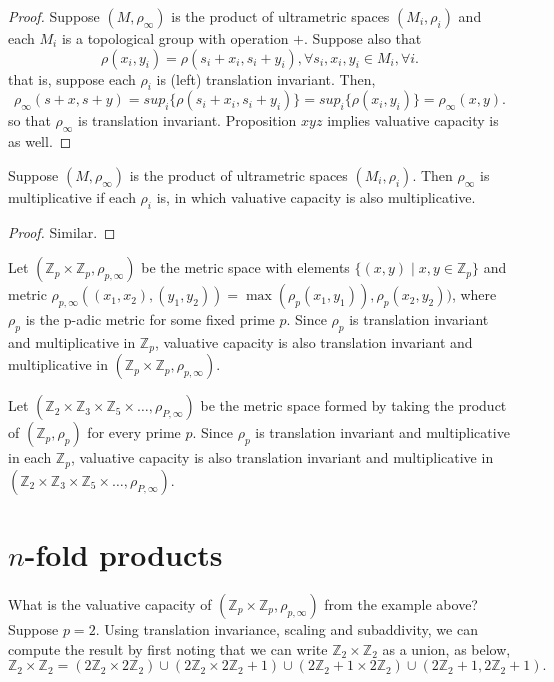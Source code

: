 \begin{proof}
Suppose $(M,\rho_\infty)$ is the product of ultrametric spaces $(M_i, \rho_i)$ and each $M_i$ is a topological group with operation $+$. Suppose also that \[\rho(x_i,y_i) = \rho(s_i + x_i, s_i +y_i), \forall s_i, x_i, y_i \in M_i, \forall i.\] that is, suppose each $\rho_i$ is (left) translation invariant. Then,  
\[
\rho_\infty(s +x, s+y)  
= sup_i\{\rho(s_i +x_i, s_i + y_i)\} 
= sup_i\{\rho(x_i, y_i)\}
= \rho_\infty(x,y).
\] so that $\rho_\infty$ is translation invariant.  Proposition $xyz$ implies valuative capacity is as well. 
\end{proof}


\begin{proposition*}
Suppose $(M,\rho_\infty)$ is the product of ultrametric spaces $(M_i, \rho_i)$. Then $\rho_\infty$ is multiplicative if each $\rho_i$ is, in which valuative capacity is also multiplicative.
\end{proposition*}

\begin{proof}
Similar.
\end{proof}

\begin{example}
	Let $(\mathbb{Z}_p \times \mathbb{Z}_p, \rho_{p,\infty})$ be the metric space with elements $\{(x,y)\mid x,y \in \mathbb{Z}_p\}$ and metric $\rho_{p,\infty}((x_1,x_2), (y_1,y_2)) = \max(\rho_p(x_1, y_1)), \rho_p(x_2, y_2))$, where $\rho_p$ is the p-adic metric for some fixed prime $p$. Since $\rho_p$ is translation invariant and multiplicative in $\mathbb{Z}_p$, valuative capacity is also translation invariant and multiplicative in  $(\mathbb{Z}_p \times \mathbb{Z}_p, \rho_{p,\infty})$.
\end{example}


\begin{example}
	Let $(\mathbb{Z}_2 \times \mathbb{Z}_3 \times \mathbb{Z}_5 \times \ldots, \rho_{P,\infty})$ be the metric space formed by taking the product of $(\mathbb{Z}_p, \rho_p)$ for every prime $p$. Since $\rho_p$ is translation invariant and multiplicative in each $\mathbb{Z}_p$, valuative capacity is also translation invariant and multiplicative in  $(\mathbb{Z}_2 \times \mathbb{Z}_3 \times \mathbb{Z}_5 \times \ldots, \rho_{P,\infty})$.
\end{example}

\section*{ \textbf{$n$-fold products}}
What is the valuative capacity of  $(\mathbb{Z}_p \times \mathbb{Z}_p, \rho_{p,\infty})$  from the example above? Suppose $p=2$.  Using translation invariance, scaling and subaddivity, we can compute the result by first noting that we can write $\mathbb{Z}_2 \times \mathbb{Z}_2$ as a union, as below,
\[
\mathbb{Z}_2 \times \mathbb{Z}_2 = (2\mathbb{Z}_2 \times 2\mathbb{Z}_2) \cup (2\mathbb{Z}_2 \times 2\mathbb{Z}_2 +1) \cup (2\mathbb{Z}_2+1 \times 2\mathbb{Z}_2) \cup (2\mathbb{Z}_2+1, 2\mathbb{Z}_2+1).
\]

